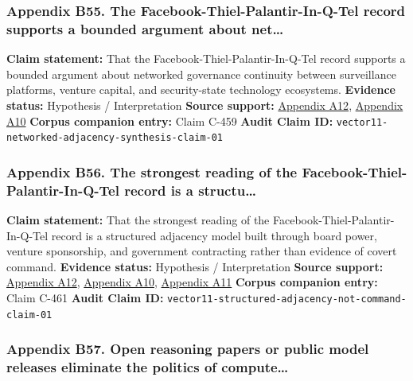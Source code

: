 \documentclass[
  american,
  11pt,
  letterpaper,
]{article}
\begin{document}
\subsubsection{Appendix B55. The Facebook-Thiel-Palantir-In-Q-Tel record
supports a bounded argument about
net\ldots{}}\label{ch-07-appendix-b55-the-facebook-thiel-palantir-in-q-tel-record-supports-a-bounded-argument-about-net}

\textbf{Claim statement:} That the Facebook-Thiel-Palantir-In-Q-Tel
record supports a bounded argument about networked governance continuity
between surveillance platforms, venture capital, and security-state
technology ecosystems. \textbf{Evidence status:} Hypothesis /
Interpretation \textbf{Source support:}
\hyperref[ch-07-appendix-a12-meta-platforms-inc-2022-definitive-proxy-statement]{Appendix
A12}, \hyperref[ch-07-appendix-a10-in-q-tel]{Appendix A10}
\textbf{Corpus companion entry:} Claim C-459 \textbf{Audit Claim ID:}
\texttt{vector11-networked-adjacency-synthesis-claim-01}

\subsubsection{Appendix B56. The strongest reading of the
Facebook-Thiel-Palantir-In-Q-Tel record is a
structu\ldots{}}\label{ch-07-appendix-b56-the-strongest-reading-of-the-facebook-thiel-palantir-in-q-tel-record-is-a-structu}

\textbf{Claim statement:} That the strongest reading of the
Facebook-Thiel-Palantir-In-Q-Tel record is a structured adjacency model
built through board power, venture sponsorship, and government
contracting rather than evidence of covert command. \textbf{Evidence
status:} Hypothesis / Interpretation \textbf{Source support:}
\hyperref[ch-07-appendix-a12-meta-platforms-inc-2022-definitive-proxy-statement]{Appendix
A12}, \hyperref[ch-07-appendix-a10-in-q-tel]{Appendix A10},
\hyperref[ch-07-appendix-a11-gotham]{Appendix A11} \textbf{Corpus
companion entry:} Claim C-461 \textbf{Audit Claim ID:}
\texttt{vector11-structured-adjacency-not-command-claim-01}

\subsubsection{Appendix B57. Open reasoning papers or public model
releases eliminate the politics of
compute\ldots{}}\label{ch-07-appendix-b57-open-reasoning-papers-or-public-model-releases-eliminate-the-politics-of-compute}
\end{document}
